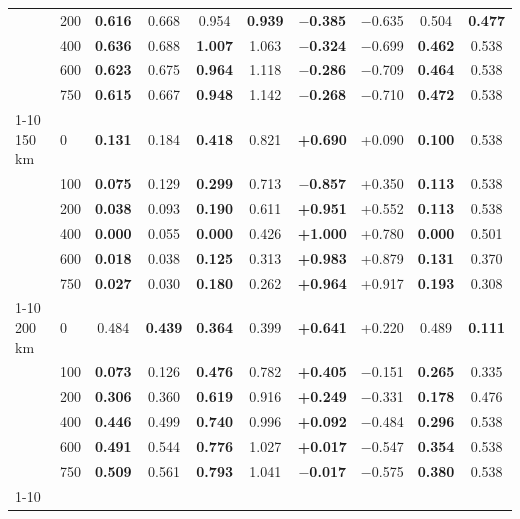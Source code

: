 \documentclass[journal]{IEEEtran}
\begin{document}
\begin{table}[!t]
\begin{tabular}{@{}llcccccccc@{}}
       & 200 & \textbf{0.616} & 0.668 & 0.954 & \textbf{0.939} & \textbf{$-$0.385} & $-$0.635 & 0.504 & \textbf{0.477} \\
       & 400 & \textbf{0.636} & 0.688 & \textbf{1.007} & 1.063 & \textbf{$-$0.324} & $-$0.699 & \textbf{0.462} & 0.538 \\
       & 600 & \textbf{0.623} & 0.675 & \textbf{0.964} & 1.118 & \textbf{$-$0.286} & $-$0.709 & \textbf{0.464} & 0.538 \\
       & 750 & \textbf{0.615} & 0.667 & \textbf{0.948} & 1.142 & \textbf{$-$0.268} & $-$0.710 & \textbf{0.472} & 0.538 \\
\cmidrule{1-10}
150 km & 0   & \textbf{0.131} & 0.184 & \textbf{0.418} & 0.821 & \textbf{+0.690} & +0.090 & \textbf{0.100} & 0.538 \\
       & 100 & \textbf{0.075} & 0.129 & \textbf{0.299} & 0.713 & \textbf{$-$0.857} & +0.350 & \textbf{0.113} & 0.538 \\
       & 200 & \textbf{0.038} & 0.093 & \textbf{0.190} & 0.611 & \textbf{+0.951} & +0.552 & \textbf{0.113} & 0.538 \\
       & 400 & \textbf{0.000} & 0.055 & \textbf{0.000} & 0.426 & \textbf{+1.000} & +0.780 & \textbf{0.000} & 0.501 \\
       & 600 & \textbf{0.018} & 0.038 & \textbf{0.125} & 0.313 & \textbf{+0.983} & +0.879 & \textbf{0.131} & 0.370 \\
       & 750 & \textbf{0.027} & 0.030 & \textbf{0.180} & 0.262 & \textbf{+0.964} & +0.917 & \textbf{0.193} & 0.308 \\
\cmidrule{1-10}
200 km & 0   & 0.484 & \textbf{0.439} & \textbf{0.364} & 0.399 & \textbf{+0.641} & +0.220 & 0.489 & \textbf{0.111} \\
       & 100 & \textbf{0.073} & 0.126 & \textbf{0.476} & 0.782 & \textbf{+0.405} & $-$0.151 & \textbf{0.265} & 0.335 \\
       & 200 & \textbf{0.306} & 0.360 & \textbf{0.619} & 0.916 & \textbf{+0.249} & $-$0.331 & \textbf{0.178} & 0.476 \\
       & 400 & \textbf{0.446} & 0.499 & \textbf{0.740} & 0.996 & \textbf{+0.092} & $-$0.484 & \textbf{0.296} & 0.538 \\
       & 600 & \textbf{0.491} & 0.544 & \textbf{0.776} & 1.027 & \textbf{+0.017} & $-$0.547 & \textbf{0.354} & 0.538 \\
       & 750 & \textbf{0.509} & 0.561 & \textbf{0.793} & 1.041 & \textbf{$-$0.017} & $-$0.575 & \textbf{0.380} & 0.538 \\
\cmidrule{1-10}

\end{tabular}
\end{table}
\end{document}
